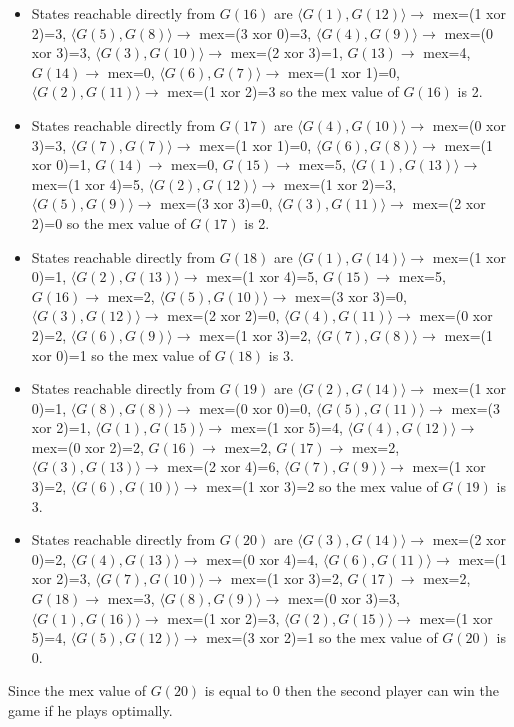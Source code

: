 \begin{solution}
\begin{itemize}
\item States reachable directly from $G(16)$ are $\langle G(1), G(12) \rangle \rightarrow$ mex=(1 xor 2)=3, $\langle G(5), G(8) \rangle \rightarrow$ mex=(3 xor 0)=3, $\langle G(4), G(9) \rangle \rightarrow$ mex=(0 xor 3)=3, $\langle G(3), G(10) \rangle \rightarrow$ mex=(2 xor 3)=1, $G(13) \rightarrow$ mex=4, $G(14) \rightarrow$ mex=0, $\langle G(6), G(7) \rangle \rightarrow$ mex=(1 xor 1)=0, $\langle G(2), G(11) \rangle \rightarrow$ mex=(1 xor 2)=3  so the mex value of $G(16)$ is 2.
\item States reachable directly from $G(17)$ are $\langle G(4), G(10) \rangle \rightarrow$ mex=(0 xor 3)=3, $\langle G(7), G(7) \rangle \rightarrow$ mex=(1 xor 1)=0, $\langle G(6), G(8) \rangle \rightarrow$ mex=(1 xor 0)=1, $G(14) \rightarrow$ mex=0, $G(15) \rightarrow$ mex=5, $\langle G(1), G(13) \rangle \rightarrow$ mex=(1 xor 4)=5, $\langle G(2), G(12) \rangle \rightarrow$ mex=(1 xor 2)=3, $\langle G(5), G(9) \rangle \rightarrow$ mex=(3 xor 3)=0, $\langle G(3), G(11) \rangle \rightarrow$ mex=(2 xor 2)=0  so the mex value of $G(17)$ is 2.
\item States reachable directly from $G(18)$ are $\langle G(1), G(14) \rangle \rightarrow$ mex=(1 xor 0)=1, $\langle G(2), G(13) \rangle \rightarrow$ mex=(1 xor 4)=5, $G(15) \rightarrow$ mex=5, $G(16) \rightarrow$ mex=2, $\langle G(5), G(10) \rangle \rightarrow$ mex=(3 xor 3)=0, $\langle G(3), G(12) \rangle \rightarrow$ mex=(2 xor 2)=0, $\langle G(4), G(11) \rangle \rightarrow$ mex=(0 xor 2)=2, $\langle G(6), G(9) \rangle \rightarrow$ mex=(1 xor 3)=2, $\langle G(7), G(8) \rangle \rightarrow$ mex=(1 xor 0)=1  so the mex value of $G(18)$ is 3.
\item States reachable directly from $G(19)$ are $\langle G(2), G(14) \rangle \rightarrow$ mex=(1 xor 0)=1, $\langle G(8), G(8) \rangle \rightarrow$ mex=(0 xor 0)=0, $\langle G(5), G(11) \rangle \rightarrow$ mex=(3 xor 2)=1, $\langle G(1), G(15) \rangle \rightarrow$ mex=(1 xor 5)=4, $\langle G(4), G(12) \rangle \rightarrow$ mex=(0 xor 2)=2, $G(16) \rightarrow$ mex=2, $G(17) \rightarrow$ mex=2, $\langle G(3), G(13) \rangle \rightarrow$ mex=(2 xor 4)=6, $\langle G(7), G(9) \rangle \rightarrow$ mex=(1 xor 3)=2, $\langle G(6), G(10) \rangle \rightarrow$ mex=(1 xor 3)=2  so the mex value of $G(19)$ is 3.
\item States reachable directly from $G(20)$ are $\langle G(3), G(14) \rangle \rightarrow$ mex=(2 xor 0)=2, $\langle G(4), G(13) \rangle \rightarrow$ mex=(0 xor 4)=4, $\langle G(6), G(11) \rangle \rightarrow$ mex=(1 xor 2)=3, $\langle G(7), G(10) \rangle \rightarrow$ mex=(1 xor 3)=2, $G(17) \rightarrow$ mex=2, $G(18) \rightarrow$ mex=3, $\langle G(8), G(9) \rangle \rightarrow$ mex=(0 xor 3)=3, $\langle G(1), G(16) \rangle \rightarrow$ mex=(1 xor 2)=3, $\langle G(2), G(15) \rangle \rightarrow$ mex=(1 xor 5)=4, $\langle G(5), G(12) \rangle \rightarrow$ mex=(3 xor 2)=1  so the mex value of $G(20)$ is 0.
\end{itemize}

Since the mex value of $G(20)$ is equal to 0 then the second player can win the game if he plays optimally.
\end{solution}

